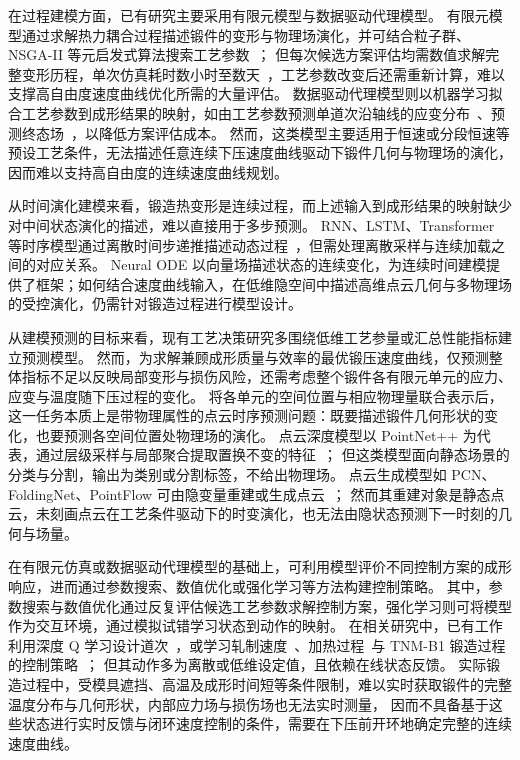 在过程建模方面，已有研究主要采用有限元模型与数据驱动代理模型。
有限元模型通过求解热力耦合过程描述锻件的变形与物理场演化，并可结合粒子群、NSGA-II 等元启发式算法搜索工艺参数~\cite{chen2019strategy, ding2024enhancing}；
但每次候选方案评估均需数值求解完整变形历程，单次仿真耗时数小时至数天~\cite{halici2014modelling}，工艺参数改变后还需重新计算，难以支撑高自由度速度曲线优化所需的大量评估。
数据驱动代理模型则以机器学习拟合工艺参数到成形结果的映射，如由工艺参数预测单道次沿轴线的应变分布~\cite{dischino2021open}、预测终态场~\cite{shivaditya2022graph}，以降低方案评估成本。
然而，这类模型主要适用于恒速或分段恒速等预设工艺条件，无法描述任意连续下压速度曲线驱动下锻件几何与物理场的演化，因而难以支持高自由度的连续速度曲线规划。

从时间演化建模来看，锻造热变形是连续过程，而上述输入到成形结果的映射缺少对中间状态演化的描述，难以直接用于多步预测。
RNN、LSTM、Transformer 等时序模型通过离散时间步递推描述动态过程~\cite{elman1990finding, hochreiter1997long, vaswani2017attention}，但需处理离散采样与连续加载之间的对应关系。
Neural ODE 以向量场描述状态的连续变化，为连续时间建模提供了框架；如何结合速度曲线输入，在低维隐空间中描述高维点云几何与多物理场的受控演化，仍需针对锻造过程进行模型设计。

从建模预测的目标来看，现有工艺决策研究多围绕低维工艺参量或汇总性能指标建立预测模型。
然而，为求解兼顾成形质量与效率的最优锻压速度曲线，仅预测整体指标不足以反映局部变形与损伤风险，还需考虑整个锻件各有限元单元的应力、应变与温度随下压过程的变化。
将各单元的空间位置与相应物理量联合表示后，这一任务本质上是带物理属性的点云时序预测问题：既要描述锻件几何形状的变化，也要预测各空间位置处物理场的演化。
点云深度模型以 PointNet++ 为代表，通过层级采样与局部聚合提取置换不变的特征~\cite{qi2017pointnetpp}；
但这类模型面向静态场景的分类与分割，输出为类别或分割标签，不给出物理场。
点云生成模型如 PCN、FoldingNet、PointFlow 可由隐变量重建或生成点云~\cite{yuan2018pcn, yang2018foldingnet, li2019pointflow}；
然而其重建对象是静态点云，未刻画点云在工艺条件驱动下的时变演化，也无法由隐状态预测下一时刻的几何与场量。

在有限元仿真或数据驱动代理模型的基础上，可利用模型评价不同控制方案的成形响应，进而通过参数搜索、数值优化或强化学习等方法构建控制策略。
其中，参数搜索与数值优化通过反复评估候选工艺参数求解控制方案，强化学习则可将模型作为交互环境，通过模拟试错学习状态到动作的映射。
在相关研究中，已有工作利用深度 Q 学习设计道次~\cite{reinisch2021successful}，或学习轧制速度~\cite{zhang2020online}、加热过程~\cite{ma2022using}与 TNM-B1 锻造过程的控制策略~\cite{stendal2024developing}；
但其动作多为离散或低维设定值，且依赖在线状态反馈。
实际锻造过程中，受模具遮挡、高温及成形时间短等条件限制，难以实时获取锻件的完整温度分布与几何形状，内部应力场与损伤场也无法实时测量，
因而不具备基于这些状态进行实时反馈与闭环速度控制的条件，需要在下压前开环地确定完整的连续速度曲线。

